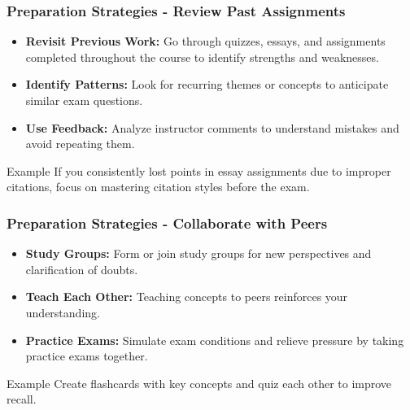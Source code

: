 \documentclass{beamer}
\begin{document}
\begin{frame}[fragile]
    \frametitle{Preparation Strategies - Review Past Assignments}
    \begin{itemize}
        \item \textbf{Revisit Previous Work:} Go through quizzes, essays, and assignments completed throughout the course to identify strengths and weaknesses.
        \item \textbf{Identify Patterns:} Look for recurring themes or concepts to anticipate similar exam questions.
        \item \textbf{Use Feedback:} Analyze instructor comments to understand mistakes and avoid repeating them.
    \end{itemize}
    
    \begin{block}{Example}
        If you consistently lost points in essay assignments due to improper citations, focus on mastering citation styles before the exam.
    \end{block}
\end{frame}

\begin{frame}[fragile]
    \frametitle{Preparation Strategies - Collaborate with Peers}
    \begin{itemize}
        \item \textbf{Study Groups:} Form or join study groups for new perspectives and clarification of doubts.
        \item \textbf{Teach Each Other:} Teaching concepts to peers reinforces your understanding.
        \item \textbf{Practice Exams:} Simulate exam conditions and relieve pressure by taking practice exams together.
    \end{itemize}
    
    \begin{block}{Example}
        Create flashcards with key concepts and quiz each other to improve recall.
    \end{block}
\end{frame}
\end{document}
